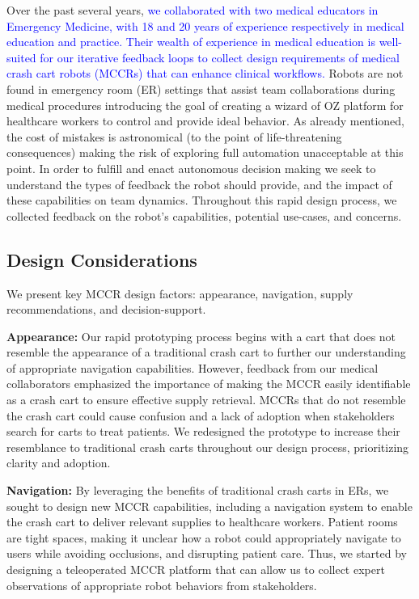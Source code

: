 Over the past several years, \textcolor{blue}{we collaborated with two medical educators in Emergency Medicine, with 18 and 20 years of experience respectively in medical education and practice. Their wealth of experience in medical education is well-suited for our iterative feedback loops to collect design requirements of medical crash cart robots  (MCCRs) that can enhance clinical workflows.} 
Robots are not found in emergency room (ER) settings that assist team collaborations during medical procedures introducing the goal of creating a wizard of OZ platform for healthcare workers to control and provide ideal behavior. 
As already mentioned, the cost of mistakes is astronomical (to the point of life-threatening consequences) making the risk of exploring full automation unacceptable at this point. 
In order to fulfill and enact autonomous decision making we seek to understand the types of feedback the robot should provide, and the impact of these capabilities on team dynamics.
Throughout this rapid design process, we collected feedback on the robot's capabilities, potential use-cases, and concerns. 

 

\subsection{Design Considerations}

We present key MCCR design factors: appearance, navigation, supply recommendations, and decision-support.

\textbf{Appearance:} Our rapid prototyping process begins with a cart that does not resemble the appearance of a traditional crash cart to further our understanding of appropriate navigation capabilities. 
However, feedback from our medical collaborators emphasized the importance of making the MCCR easily identifiable as a crash cart to ensure effective supply retrieval. 
MCCRs that do not resemble the crash cart could cause confusion and a lack of adoption when stakeholders search for carts to treat patients. 
We redesigned the prototype to increase their resemblance to traditional crash carts throughout our design process, prioritizing clarity and adoption.

\textbf{Navigation:} By leveraging the benefits of traditional crash carts in ERs, we sought to design new MCCR capabilities, including a navigation system to enable the crash cart to deliver relevant supplies to healthcare workers.
Patient rooms are tight spaces, making it unclear how a robot could appropriately navigate to users while avoiding occlusions, and disrupting patient care.
Thus, we started by designing a teleoperated MCCR platform that can allow us to collect expert observations of appropriate robot behaviors from stakeholders. 

